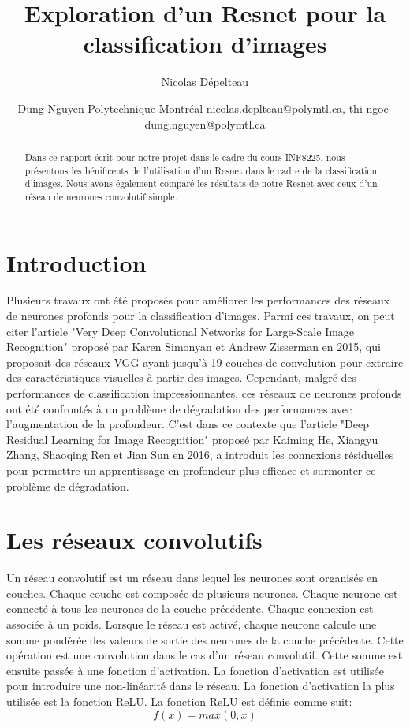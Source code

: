 \documentclass{article}
\title{Exploration d'un Resnet pour la classification d'images}
\author{
Nicolas Dépelteau
\and
Dung Nguyen
\affiliations
Polytechnique Montréal
\emails
nicolas.deplteau@polymtl.ca,
thi-ngoc-dung.nguyen@polymtl.ca
}
\begin{document}
\maketitle

\begin{abstract}
    Dans ce rapport écrit pour notre projet dans le cadre du cours INF8225,
    nous présentons les bénificents de l'utilisation
    d'un Resnet dans le cadre de la classification d'images. Nous avons également comparé les
    résultats de notre Resnet avec ceux d'un réseau de neurones convolutif simple. 
\end{abstract}

\section{Introduction}

Plusieurs travaux ont été proposés pour améliorer les performances des réseaux de neurones profonds pour la classification d'images.
Parmi ces travaux, on peut citer l'article "Very Deep Convolutional Networks for Large-Scale Image Recognition" proposé par Karen Simonyan et Andrew Zisserman en 2015, qui proposait des réseaux VGG ayant jusqu'à 19 couches de convolution pour extraire des caractéristiques visuelles à partir des images.
Cependant, malgré des performances de classification impressionnantes, ces réseaux de neurones profonds ont été confrontés à un problème de dégradation des performances avec l'augmentation de la profondeur.
C'est dans ce contexte que l'article "Deep Residual Learning for Image Recognition" proposé par Kaiming He, Xiangyu Zhang, Shaoqing Ren et Jian Sun en 2016, a introduit les connexions résiduelles pour permettre un apprentissage en profondeur plus efficace et surmonter ce problème de dégradation.

\section{Les réseaux convolutifs}
Un réseau convolutif est un réseau dans lequel les neurones sont organisés en couches.
Chaque couche est composée de plusieurs neurones. Chaque neurone est connecté à tous les neurones de la couche précédente.
Chaque connexion est associée à un poids. Lorsque le réseau est activé, chaque neurone calcule une somme
pondérée des valeurs de sortie des neurones de la couche précédente.
Cette opération est une convolution dans le cas d'un réseau convolutif.
Cette somme est ensuite passée à une fonction d'activation.
La fonction d'activation est utilisée pour introduire une non-linéarité dans le réseau.
La fonction d'activation la plus utilisée est la fonction ReLU. La fonction ReLU est définie comme suit:
\begin{equation}
    f(x) = max(0, x)
\end{equation}
\end{document}
